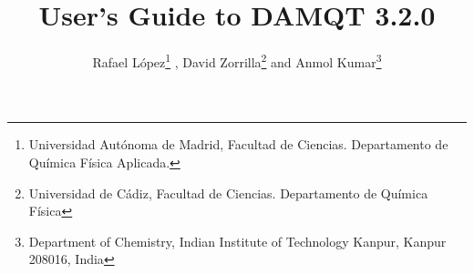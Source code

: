\documentclass[10pt]{article}
\title{User's Guide to DAMQT 3.2.0}
\author{Rafael L\'opez\footnote{Universidad Aut\'onoma de
Madrid,
Facultad de Ciencias. Departamento de Qu\'{i}mica F\'{i}sica Aplicada.}{ },
David Zorrilla\footnote{Universidad de C\'adiz,
Facultad de Ciencias. Departamento de Qu\'{i}mica F\'{i}sica}
and
Anmol Kumar\footnote{Department of Chemistry, Indian Institute of Technology Kanpur, 
Kanpur 208016, India}}
\begin{document}
\newcommand{\azul}[1]{{\color{blue}{#1}}}
\newcommand{\llaves}[1]{{\{#1\}}}
\newcommand{\be}{\begin{equation}}
\newcommand{\ee}{\end{equation}}
\newcommand{\ba}{\begin{array}}
\newcommand{\ea}{\end{array}}
\newcommand{\baa}{\begin{eqnarray}}
\newcommand{\eaa}{\end{eqnarray}}
\newcommand{\rne}{{\bf r}}
\newcommand{\Rne}{{\bf R}}
\newcommand{\Ene}{{\bf E}}
\newcommand{\Fne}{{\bf F}}
\newcommand{\Sne}{{\bf S}}
\newcommand{\Acal}{\mathscr{A}}
\newcommand{\Vcal}{\mathscr{V}}
\newcommand{\aux}{{\it .aux}}
\newcommand{\basis}{{\it .basis}}
\newcommand{\bmp}{{\it .bmp}}
\newcommand{\cam}{{\it .cam}}
\newcommand{\camdosD}{{\it .cam2D}}
\newcommand{\chk}{{\it .chk}}
\newcommand{\cnt}{{\it .cnt}}
\newcommand{\com}{{\it .com}}
\newcommand{\control}{{\it .control}}
\newcommand{\coords}{{\it .coords}}
\newcommand{\cplt}{{\it cxx-d.plt}}
\newcommand{\damproj}{{\it .damproj}}
\newcommand{\damqt}{{\it \_2016.damqt}}
\newcommand{\dmqtv}{{\it \_2016.dmqtv}}
\newcommand{\den}{{\it .den}}
\newcommand{\dengr}{{\it .dengr}}
\newcommand{\dengrdosD}{{\it .dengr2D}}
\newcommand{\dengz}{{\it .den.gz}}
\newcommand{\dplt}{{\it -d.pltd}}
\newcommand{\fcf}{{\it .fcf}}
\newcommand{\fchk}{{\it .fchk}}
\newcommand{\fnc}{{\it .fnc}}
\newcommand{\formchk}{{\it .formchk}}
\newcommand{\frad}{{\it .frad}}
\newcommand{\fre}{{\it .fre}}
\newcommand{\frgplt}{{\it frg-d.plt}}
\newcommand{\fri}{{\it .fri}}
\newcommand{\frt}{{\it .frt}}
\newcommand{\ggbs}{{\it .ggbs}}
\newcommand{\gnu}{{\it .gnu}}
\newcommand{\inp}{{\it .inp}}
\newcommand{\jpg}{{\it .jpg}}
\newcommand{\jpeg}{{\it .jpeg}}
\newcommand{\mkl}{{\it .mkl}}
\newcommand{\mos}{{\it .mos}}
\newcommand{\nwcout}{{\it .nwcout}}
\newcommand{\out}{{\it .out}}
\newcommand{\png}{{\it .png}}
\newcommand{\ppm}{{\it .ppm}}
\newcommand{\plt}{{\it .plt}}
\newcommand{\pltd}{{\it .pltd}}
\newcommand{\sgbs}{{\it .sgbs}}
\newcommand{\sgh}{{\it .sgh}}
\newcommand{\tiff}{{\it .tiff}}
\newcommand{\xml}{{\it .xml}}
\newcommand{\xpm}{{\it .xpm}}
\newcommand{\xbm}{{\it .xbm}}
\newcommand{\xyz}{{\it .xyz}}

\newcommand{\tttmake}{\texttt{make }}
\newcommand{\tttmakeinstall}{\texttt{make install }}
\newcommand{\tttconfigure}{\texttt{./configure }}
\newcommand{\tttshconfigure}{\texttt{sh ./configure }}
\end{document}
